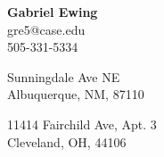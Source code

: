\documentclass[11pt]{article}
\begin{document}
\newcommand{\ressection}[1]{\setul{2pt}{.4pt}\large{\textbf{\ul{#1}}\\[0.3\baselineskip]}}
\newcommand{\eosec}[0]{~\\[0.6\baselineskip]}

\begin{center}\Large{\textbf{Gabriel Ewing}}\\[0.5\baselineskip]
    \large{gre5@case.edu}\\
    \large{505-331-5334}
\end{center}
\begin{paracol}{2}
    \begin{flushleft}
     Sunningdale Ave NE\\
    Albuquerque, NM, 87110
\end{flushleft}
    \switchcolumn
    \noindent \begin{flushright}11414 Fairchild Ave, Apt. 3\\
    Cleveland, OH, 44106\end{flushright}
\end{paracol}
\end{document}

